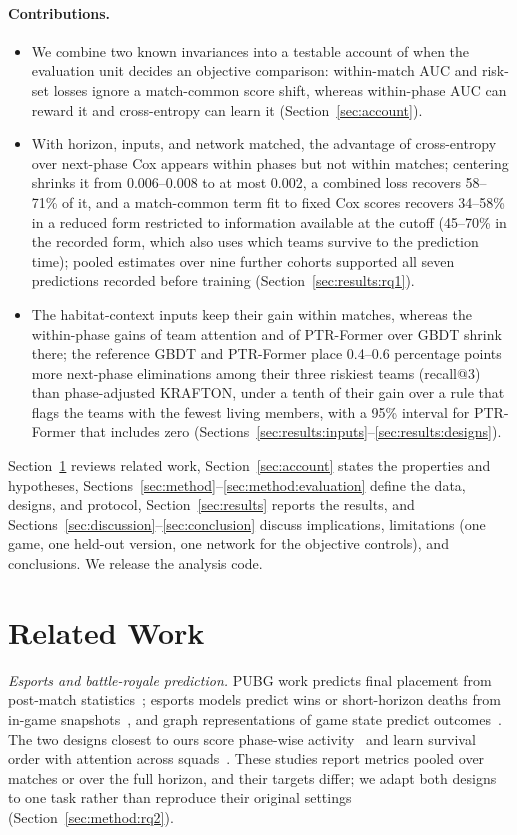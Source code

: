 \documentclass[sigconf,anonymous,nonacm]{acmart}
\begin{document}
\paragraph{Contributions.}
\begin{itemize}
\item We combine two known invariances into a testable account of when the evaluation unit decides an objective comparison: within-match AUC and risk-set losses ignore a match-common score shift, whereas within-phase AUC can reward it and cross-entropy can learn it (Section~\ref{sec:account}).
\item With horizon, inputs, and network matched, the advantage of cross-entropy over next-phase Cox appears within phases but not within matches; centering shrinks it from 0.006--0.008 to at most 0.002, a combined loss recovers 58--71\% of it, and a match-common term fit to fixed Cox scores recovers 34--58\% in a reduced form restricted to information available at the cutoff (45--70\% in the recorded form, which also uses which teams survive to the prediction time); pooled estimates over nine further cohorts supported all seven predictions recorded before training (Section~\ref{sec:results:rq1}).
\item The habitat-context inputs keep their gain within matches, whereas the within-phase gains of team attention and of PTR-Former over GBDT shrink there; the reference GBDT and PTR-Former place 0.4--0.6 percentage points more next-phase eliminations among their three riskiest teams (recall@3) than phase-adjusted KRAFTON, under a tenth of their gain over a rule that flags the teams with the fewest living members, with a 95\% interval for PTR-Former that includes zero (Sections~\ref{sec:results:inputs}--\ref{sec:results:designs}).
\end{itemize}
Section~\ref{sec:related} reviews related work, Section~\ref{sec:account} states the properties and hypotheses, Sections~\ref{sec:method}--\ref{sec:method:evaluation} define the data, designs, and protocol, Section~\ref{sec:results} reports the results, and Sections~\ref{sec:discussion}--\ref{sec:conclusion} discuss implications, limitations (one game, one held-out version, one network for the objective controls), and conclusions. We release the analysis code.

\section{Related Work}
\label{sec:related}
\emph{Esports and battle-royale prediction.} PUBG work predicts final placement from post-match statistics~\cite{KagglePUBG,LeeLee25}; esports models predict wins or short-horizon deaths from in-game snapshots~\cite{Hodge21,Katona19,Marshall22}, and graph representations of game state predict outcomes~\cite{Xenopoulos21}. The two designs closest to ours score phase-wise activity~\cite{Sagong25a} and learn survival order with attention across squads~\cite{KRAFTON}. These studies report metrics pooled over matches or over the full horizon, and their targets differ; we adapt both designs to one task rather than reproduce their original settings (Section~\ref{sec:method:rq2}).
\end{document}

